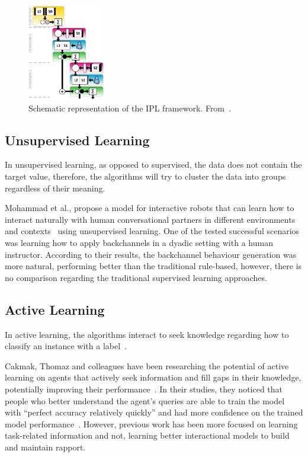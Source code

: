\begin{figure}
	\centering
	\includegraphics[width=0.3\textwidth]{images/IPL_system.png}
	\caption{Schematic representation of the \ac{IPL} framework. From~\cite{Kok2012}.}
	\label{fig:ipl_system}
\end{figure}

\subsection{Unsupervised Learning}

In unsupervised learning, as opposed to supervised, the data does not contain the target value, therefore, the algorithms will try to cluster the data into groups regardless of their meaning.

Mohammad et al., propose a model for interactive robots that can learn how to interact naturally with human conversational partners in different environments and contexts~\cite{Mohammad2010} using unsupervised learning. One of the tested successful scenarios was learning how to apply backchannels in a dyadic setting with a human instructor. According to their results, the backchannel behaviour generation was more natural, performing better than the traditional rule-based, however, there is no comparison regarding the traditional supervised learning approaches.

\subsection{Active Learning}
In active learning, the algorithms interact to seek knowledge regarding how to classify an instance with a label~\cite{Bishop2006}.

Cakmak, Thomaz and colleagues have been researching the potential of active learning on agents that actively seek information and fill gaps in their knowledge, potentially improving their performance~\cite{Chao2010, Cakmak2010, Cakmak2012, Thomaz2006}. In their studies, they noticed that people who better understand the agent's queries are able to train the model with ``perfect accuracy relatively quickly'' and had more confidence on the trained model performance~\cite{Chao2010}. However, previous work has been more focused on learning task-related information and not, learning better interactional models to build and maintain rapport.

